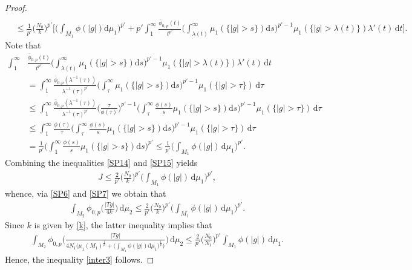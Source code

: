 \documentclass[10pt,a4paper]{amsart}
\def\d{\mathrm{d}}
\begin{document}
\begin{proof}
\begin{align}
    \\ \nonumber & \leq 
    \frac{1}{p'} \Big(\frac{N_0}{k}\Big)^{p'}\bigg[\bigg(\int_{M_1}\phi(|g|)\d \mu_1\bigg)^{p'} 
    + p'
    \int_1^\infty \frac{ \overline \phi_{0,p}(t)}{t^{p'}}\bigg(\int_{\lambda (t)}^\infty \mu_1(\{|g|>s\})\d s\bigg)^{p'-1} 
    \mu_1(\{|g|>\lambda (t)\})\lambda '(t)\, \d t\bigg].
    \end{align}
    Note that
\begin{align}
    \label{SP15}
    \int_1^\infty& \frac{  \overline \phi_{0,p}(t)}{t^{p'}}\bigg(\int_{\lambda (t)}^\infty \mu_1(\{|g|>s\})\d s\bigg)^{p'-1} 
    \mu_1(\{|g|>\lambda (t)\})\lambda '(t)\, \d t
    \\  \nonumber & = \int_1^\infty \frac{ \overline \phi_{0,p}(\lambda ^{-1}(\tau))}{\lambda ^{-1}(\tau)^{p'}}\bigg(\int_{\tau}^\infty \mu_1(\{|g|>s\})\d s\bigg)^{p'-1} 
    \mu_1(\{|g|>\tau\})\, \d \tau
    \\  \nonumber & \leq 
    \int_1^\infty \frac{ \overline \phi_{0,p}(\lambda ^{-1}(\tau))}{\lambda ^{-1}(\tau)^{p'}} \bigg(\frac{\tau}{\phi(\tau)}\bigg)^{p'-1}
\bigg(\int_{\tau}^\infty\frac{\phi(s)}{s} \mu_1(\{|g|>s\})\d s\bigg)^{p'-1} 
    \mu_1(\{|g|>\tau\})\, \d \tau
    \\  \nonumber & \leq\int_1^\infty \frac{\phi(\tau)}{\tau} 
\bigg(\int_{\tau}^\infty\frac{\phi(s)}{s} \mu_1(\{|g|>s\})\d s\bigg)^{p'-1} 
    \mu_1(\{|g|>\tau\})\, \d \tau
     \\  \nonumber & =\frac{1}{p'}\bigg(\int_{1}^\infty\frac{\phi(s)}{s} \mu_1(\{|g|>s\})\d s\bigg)^{p'} \leq \frac{1}{p'} \bigg(\int_{M_1}\phi(|g|)\, \d \mu_1\bigg)^{p'}.
\end{align}
Combining the inequalities \eqref{SP14} and \eqref{SP15} yields
\begin{align}
    \label{SP16}
    J \leq \frac{2}{p'} \Big(\frac{N_0}{k}\Big)^{p'}\bigg(\int_{M_1}\phi(|g|)\, \d \mu_1\bigg)^{p'},
\end{align}
    whence, via \eqref{SP6} and \eqref{SP7} we obtain that
    \begin{align}
        \label{SP17}
        \int_{M_2}   \phi_{0,p}\Big(\frac{|Tg|}{4k}\Big)\, \d\mu_2 \leq \frac{2}{p'} \Big(\frac{N_0}{k}\Big)^{p'}\bigg(\int_{M_1}\phi(|g|)\, \d \mu_1\bigg)^{p'}.
    \end{align}
    Since $k$ is given by \eqref{k}, the latter inequality implies that
    \begin{align}
        \label{SP18}
           \int_{M_2}   \phi_{0,p}\Bigg(\frac{|Tg|}{4 N_1 
       \big(\mu_1(M_1)^{\frac 1p} + \big(\int_{M_1}\phi(|g|)\d \mu_1\big)^{\frac 1p}\big)
        }\Bigg)\, \d\mu_2 \leq \frac{2}{p'} \Big(\frac{N_0}{N_1}\Big)^{p'} \int_{M_1}\phi(|g|)\, \d \mu_1.
    \end{align}
    Hence, the inequality \eqref{inter3} follows.
\end{proof}
\end{document}
